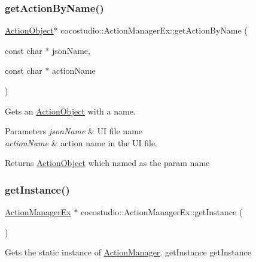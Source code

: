 \subsubsection{\texorpdfstring{get\+Action\+By\+Name()}{getActionByName()}\hspace{0.1cm}{\footnotesize\ttfamily [2/2]}}
{\footnotesize\ttfamily \hyperlink{classcocostudio_1_1ActionObject}{Action\+Object}$\ast$ cocostudio\+::\+Action\+Manager\+Ex\+::get\+Action\+By\+Name (\begin{DoxyParamCaption}\item[{const char $\ast$}]{json\+Name,  }\item[{const char $\ast$}]{action\+Name }\end{DoxyParamCaption})}

Gets an \hyperlink{classcocostudio_1_1ActionObject}{Action\+Object} with a name.


\begin{DoxyParams}{Parameters}
{\em json\+Name} & UI file name\\
\hline
{\em action\+Name} & action name in the UI file.\\
\hline
\end{DoxyParams}
\begin{DoxyReturn}{Returns}
\hyperlink{classcocostudio_1_1ActionObject}{Action\+Object} which named as the param name 
\end{DoxyReturn}
\mbox{\label{classcocostudio_1_1ActionManagerEx_a463950006b48c1e0eb1062aa58639acd}} 
\subsubsection{\texorpdfstring{get\+Instance()}{getInstance()}\hspace{0.1cm}{\footnotesize\ttfamily [1/2]}}
{\footnotesize\ttfamily \hyperlink{classcocostudio_1_1ActionManagerEx}{Action\+Manager\+Ex} $\ast$ cocostudio\+::\+Action\+Manager\+Ex\+::get\+Instance (\begin{DoxyParamCaption}{ }\end{DoxyParamCaption})\hspace{0.3cm}{\ttfamily [static]}}

Gets the static instance of \hyperlink{classActionManager}{Action\+Manager}.  get\+Instance  get\+Instance \mbox{\label{classcocostudio_1_1ActionManagerEx_ab7e5f5a0a4fe860bbd3b64b2d257359a}} 
